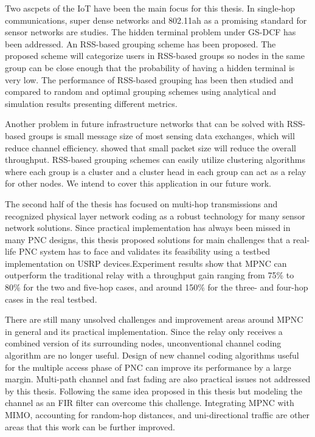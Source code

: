 \label{chapter:concl}

Two ascpets of the IoT have been the main focus for this thesis. In single-hop communications, super dense networks and 802.11ah as a promising standard for sensor networks are studies. The hidden terminal problem under GS-DCF has been addressed. An RSS-based grouping scheme has been proposed. The proposed scheme will categorize users in RSS-based groups so nodes in the same group can be close enough that the probability of having a hidden terminal is very low.
The performance of RSS-based grouping has been then studied and compared to random and optimal grouping schemes using analytical and simulation results presenting different metrics.

Another problem in future infrastructure networks that can be solved with RSS-based groups is small message size of most sensing data exchanges, which will reduce channel efficiency. \cite{bianchi2000performance} showed that small packet size will reduce the overall throughput. RSS-based grouping schemes can easily utilize clustering algorithms where each group is a cluster and a cluster head in each group can act as a relay for other nodes. We intend to cover this application in our future work.

The second half of the thesis has focused on multi-hop transmissions and recognized physical layer network coding as a robust technology for many sensor network solutions. Since practical implementation has always been missed in many PNC designs, this thesis proposed solutions for main challenges that a real-life PNC system has to face and validates its feasibility using a testbed implementation on USRP devices.Experiment results show that MPNC can outperform the traditional relay with a throughput gain ranging from 75\% to 80\% for the two and five-hop cases, and around 150\% for the three- and four-hop cases in the real testbed.

There are still many unsolved challenges and improvement areas around MPNC in general and its practical implementation. Since the relay only receives a combined version of its surrounding nodes, unconventional channel coding algorithm are no longer useful. Design of new channel coding algorithms useful for the multiple access phase of PNC can improve its performance by a large margin. Multi-path channel and fast fading are also practical issues not addressed by this thesis. Following the same idea proposed in this thesis but modeling the channel as an FIR filter can overcome this challenge. Integrating MPNC with MIMO, accounting for random-hop distances, and uni-directional traffic are other areas that this work can be further improved.